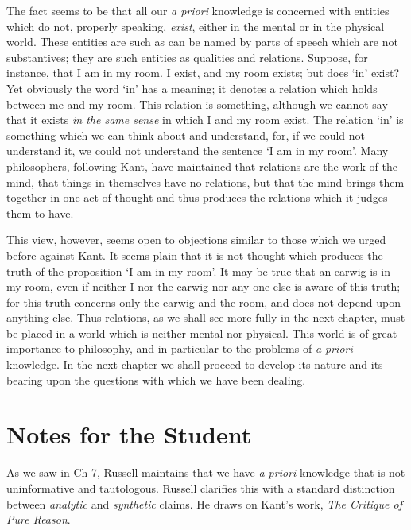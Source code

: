 \documentclass[oneside,letterpaper,12pt]{book}
\begin{document}
The fact seems to be that all our \emph{a priori} knowledge is concerned
with entities which do not, properly speaking, \emph{exist}, either in
the mental or in the physical world. These entities are such as can be
named by parts of speech which are not substantives; they are such
entities as qualities and relations. Suppose, for instance, that I am in
my room. I exist, and my room exists; but does
`in' exist? Yet obviously the word
`in' has a meaning; it denotes a
relation which holds between me and my room. This relation is something,
although we cannot say that it exists \emph{in the same sense} in which
I and my room exist. The relation `in'
is something which we can think about and understand, for, if we could
not understand it, we could not understand the sentence
`I am in my room'. Many philosophers,
following Kant, have maintained that relations are the work of the mind,
that things in themselves have no relations, but that the mind brings
them together in one act of thought and thus produces the relations
which it judges them to have.

This view, however, seems open to objections similar to those which we
urged before against Kant. It seems plain that it is not thought which
produces the truth of the proposition `I am in my
room'. It may be true that an earwig is in my room, even
if neither I nor the earwig nor any one else is aware of this truth; for
this truth concerns only the earwig and the room, and does not depend
upon anything else. Thus relations, as we shall see more fully in the
next chapter, must be placed in a world which is neither mental nor
physical. This world is of great importance to philosophy, and in
particular to the problems of \emph{a priori} knowledge. In the next
chapter we shall proceed to develop its nature and its bearing upon the
questions with which we have been dealing.

\protect\hypertarget{link2HCH0009}{}{}

\pagebreak
\section{Notes for the Student}
As we saw in Ch 7, Russell maintains that we have \textit{a priori} knowledge that is not uninformative and tautologous. Russell clarifies this with a standard distinction between \textit{analytic} and \textit{synthetic} claims. He draws on Kant's work, \textit{The Critique of Pure Reason}. 
\end{document}
